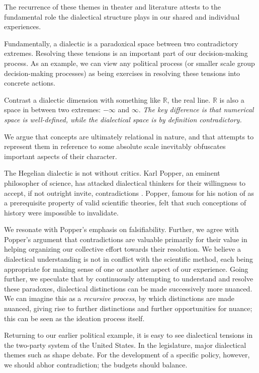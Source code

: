 \documentclass[12pt]{book}
\begin{document}
The recurrence of these themes in theater and literature attests to the fundamental role the dialectical structure plays in our shared and individual experiences.

Fundamentally, a dialectic is a paradoxical space between two contradictory extremes.
Resolving these tensions is an important part of our decision-making process.
As an example, we can view any political process (or smaller scale group decision-making processes) as being exercises in resolving these tensions into concrete actions.

Contrast a dialectic dimension with something like $\mathbb{R}$, the real line.
$\mathbb{R}$ is also a space in between two extremes: $-\infty$ and $\infty$.
\textit{The key difference is that numerical space is well-defined, while the dialectical space is by definition contradictory.}

We argue that concepts are ultimately relational in nature, and that attempts to represent them in reference to some absolute scale inevitably obfuscates important aspects of their character.

The Hegelian dialectic is not without critics.
Karl Popper, an eminent philosopher of science, has attacked dialectical thinkers for their willingness to accept, if not outright invite, contradictions \cite{popper}.
Popper, famous for his notion of  as a prerequisite property of valid scientific theories, felt that such conceptions of history were impossible to invalidate.

We resonate with Popper's emphasis on falsifiability.
Further, we agree with Popper's argument that contradictions are valuable primarily for their value in helping organizing our collective effort towards their resolution.
We believe a dialectical understanding is not in conflict with the scientific method, each being appropriate for making sense of one or another aspect of our experience.
Going further, we speculate that by continuously attempting to understand and resolve these paradoxes, dialectical distinctions can be made successively more nuanced.
We can imagine this as a \textit{recursive process}, by which distinctions are made nuanced, giving rise to further distinctions and further opportunities for nuance; this can be seen as the ideation process itself.

\bigskip

Returning to our earlier political example, it is easy to see dialectical tensions in the two-party system of the United States.
In the legislature, major dialectical themes such as  shape debate.
For the development of a specific policy, however, we should abhor contradiction; the budgets should balance.
\end{document}
